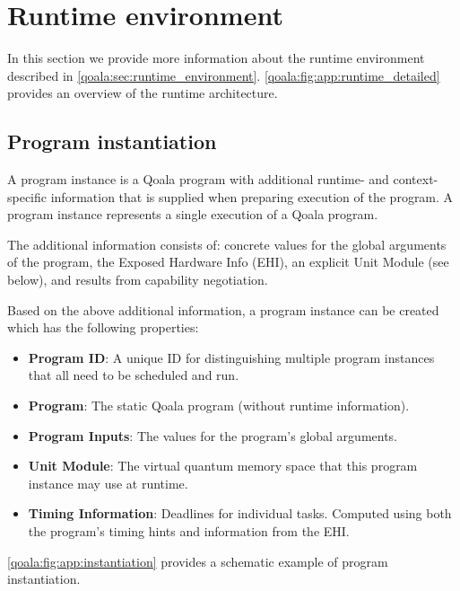 \section{Runtime environment}
\label{qoala:sec:app:runtime_environment}
In this section we provide more information about the runtime environment described in \cref{qoala:sec:runtime_environment}.
\cref{qoala:fig:app:runtime_detailed} provides an overview of the runtime architecture.

\subsection{Program instantiation}
A program instance is a Qoala program with additional runtime- and context-specific information that is supplied when preparing execution of the program.
A program instance represents a single execution of a Qoala program.

The additional information consists of:
concrete values for the global arguments of the program,
the Exposed Hardware Info (EHI),
an explicit Unit Module (see below), and
results from capability negotiation.

Based on the above additional information, a program instance can be created which has the following properties:
\begin{itemize}
\item \textbf{Program ID}: A unique ID for distinguishing multiple program instances that all need to be scheduled and run.
\item \textbf{Program}: The static Qoala program (without runtime information).
\item \textbf{Program Inputs}: The values for the program's global arguments.
\item \textbf{Unit Module}: The virtual quantum memory space that this program instance may use at runtime.
\item \textbf{Timing Information}: Deadlines for individual tasks. Computed using both the program's timing hints and information from the EHI.
\end{itemize}

\cref{qoala:fig:app:instantiation} provides a schematic example of program instantiation.

